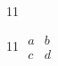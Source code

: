 \documentclass[paper=A4]{ropas-poster}
\begin{document}
\begin{postergrid}{1}{1}
\begin{posterblock}{1}{1}
$\begin{array}{cc}a&b\\c&d\end{array}$
\end{posterblock}
\end{postergrid}
\end{document}

